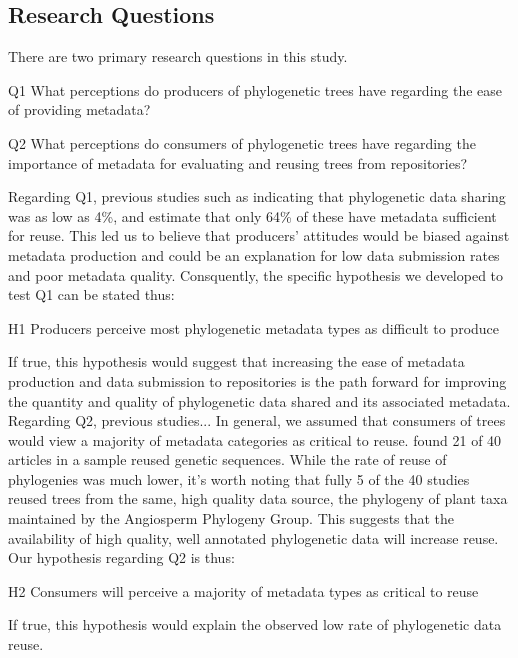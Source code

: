 \documentclass[12pt]{scrartcl}
\begin{document}
\begin{multicols}{2}
\subsection{Research Questions}
There are two primary research questions in this study.  
\begin{compactitem}
	\item[Q1] What perceptions do producers of phylogenetic trees have regarding the ease of providing metadata?
	\item[Q2] What perceptions do consumers of phylogenetic trees have regarding the importance of metadata for evaluating and reusing trees from repositories?
\end{compactitem}
Regarding Q1, previous studies such as \citet{Stoltzfus2012} indicating that phylogenetic data sharing was as low as 4\%, and \citet{Drew2013} estimate that only 64\% of these have metadata sufficient for reuse. This led us to believe that producers' attitudes would be biased against metadata production and could be an explanation for low data submission rates and poor metadata quality.  Consquently, the specific hypothesis we developed to test Q1 can be stated thus:
\begin{compactitem}
	\item[H1] Producers perceive most phylogenetic metadata types as difficult to produce
\end{compactitem}
If true, this hypothesis would suggest that increasing the ease of metadata production and data submission to repositories is the path forward for improving the quantity and quality of phylogenetic data shared and its associated metadata.
Regarding Q2, previous studies...%
In general, we assumed that consumers of trees would view a majority of metadata categories as critical to reuse.  \citet{Stoltzfus2012} found 21 of 40 articles in a sample reused genetic sequences.  While the rate of reuse of phylogenies was much lower, it's worth noting that fully 5 of the 40 studies reused trees from the same, high quality data source, the phylogeny of plant taxa maintained by the Angiosperm Phylogeny Group. %
This suggests that the availability of high quality, well annotated phylogenetic data will increase reuse.  Our hypothesis regarding Q2 is thus:
\begin{compactitem}
	\item[H2] Consumers will perceive a majority of metadata types as critical to reuse
\end{compactitem}
If true, this hypothesis would explain the observed low rate of phylogenetic data reuse.


\end{multicols}
\end{document}
